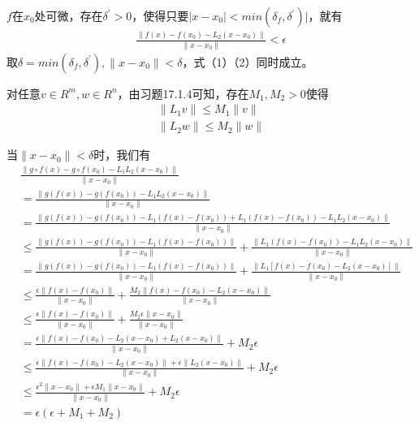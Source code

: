 \documentclass{article}
\begin{document}
$f$在$x_0$处可微，存在$\delta^\prime > 0$，使得只要$|x - x_0| < min(\delta_f,\delta^\prime)|$，就有
\begin{align}
  \frac{\|f(x) - f(x_0) - L_2(x - x_0)\|}{\|x - x_0\|} < \epsilon
\end{align}
取$\delta = min(\delta_f,\delta^\prime), \|x - x_0 \| < \delta$，式（1）（2）同时成立。

对任意$v \in R^m, w \in R^n$，由习题17.1.4可知，存在$M_1, M_2 > 0$使得
\begin{align*}
  \|L_1 v\| \leq M_1 \|v\| \\
  \|L_2 w\| \leq M_2 \|w\|
\end{align*}

当$\| x - x_0 \| < \delta$时，我们有
\begin{align*}
   & \frac{\|g \circ f(x) - g \circ f(x_0) - L_1L_2(x - x_0)\|}{\|x - x_0\|}                                                              \\
   & = \frac{\|g(f(x)) - g(f(x_0)) - L_1L_2(x - x_0)\|}{\|x - x_0\|}                                                                      \\
   & = \frac{\|g(f(x)) - g(f(x_0)) - L_1(f(x) - f(x_0)) + L_1(f(x) - f(x_0)) - L_1L_2(x - x_0)\|}{\|x - x_0\|}                            \\
   & \leq \frac{\|g(f(x)) - g(f(x_0)) - L_1(f(x) - f(x_0))\|}{\|x - x_0\|} + \frac{\|L_1(f(x) - f(x_0)) - L_1L_2(x - x_0)\|}{\|x - x_0\|} \\
   & = \frac{\|g(f(x)) - g(f(x_0)) - L_1(f(x) - f(x_0))\|}{\|x - x_0\|} + \frac{\|L_1[f(x) - f(x_0) - L_2(x - x_0)]\|}{\|x - x_0\|}       \\
   & \leq \frac{\epsilon \|f(x) - f(x_0)\|}{\|x - x_0\|} + \frac{M_2\|f(x) - f(x_0) - L_2(x - x_0)\|}{\|x - x_0\|}                        \\
   & \leq \frac{\epsilon \|f(x) - f(x_0)\|}{\|x - x_0\|} + \frac{M_2\epsilon \|x - x_0\|}{\|x - x_0\|}                                    \\
   & = \frac{\epsilon \|f(x) - f(x_0) - L_2(x - x_0) + L_2(x - x_0)\|}{\|x - x_0\|} + M_2\epsilon                                         \\
   & \leq \frac{\epsilon \|f(x) - f(x_0) - L_2(x - x_0)\| + \epsilon\|L_2(x - x_0)\|}{\|x - x_0\|} + M_2\epsilon                          \\
   & \leq \frac{\epsilon^2\|x - x_0\| + \epsilon M_1\|x - x_0\|}{\|x - x_0\|} + M_2\epsilon                                               \\
   & = \epsilon(\epsilon + M_1 + M_2)
\end{align*}
\end{document}
